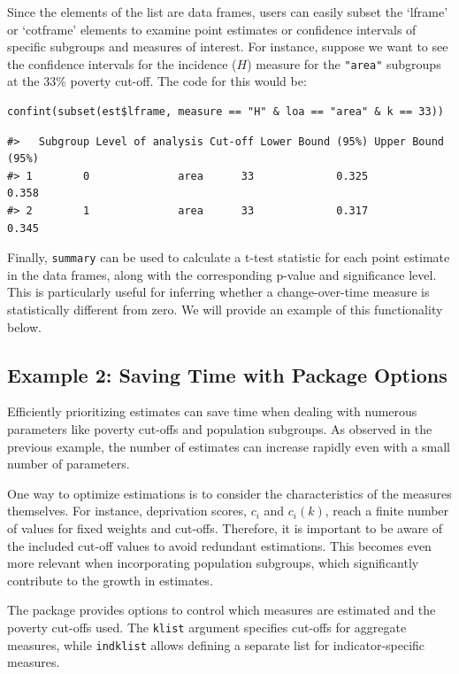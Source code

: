 Since the elements of the list are data frames, users can easily subset the `lframe' or `cotframe' elements to examine point estimates or confidence intervals of specific subgroups and measures of interest. For instance, suppose we want to see the confidence intervals for the incidence (\(H\)) measure for the \texttt{"area"} subgroups at the 33\% poverty cut-off. The code for this would be:

\begin{verbatim}
confint(subset(est$lframe, measure == "H" & loa == "area" & k == 33))
\end{verbatim}

\begin{verbatim}
#>   Subgroup Level of analysis Cut-off Lower Bound (95%) Upper Bound (95%)
#> 1        0              area      33             0.325             0.358
#> 2        1              area      33             0.317             0.345
\end{verbatim}

Finally, \texttt{summary} can be used to calculate a t-test statistic for each point estimate in the data frames, along with the corresponding p-value and significance level. This is particularly useful for inferring whether a change-over-time measure is statistically different from zero. We will provide an example of this functionality below.

\subsection{Example 2: Saving Time with Package Options}\label{example-2-saving-time-with-package-options}

Efficiently prioritizing estimates can save time when dealing with numerous parameters like poverty cut-offs and population subgroups. As observed in the previous example, the number of estimates can increase rapidly even with a small number of parameters.

One way to optimize estimations is to consider the characteristics of the measures themselves. For instance, deprivation scores, \(c_i\) and \(c_i(k)\), reach a finite number of values for fixed weights and cut-offs. Therefore, it is important to be aware of the included cut-off values to avoid redundant estimations. This becomes even more relevant when incorporating population subgroups, which significantly contribute to the growth in estimates.

The  package provides options to control which measures are estimated and the poverty cut-offs used. The \texttt{klist} argument specifies cut-offs for aggregate measures, while \texttt{indklist} allows defining a separate list for indicator-specific measures.

